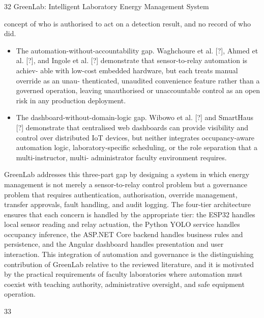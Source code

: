 32
GreenLab: Intelligent Laboratory Energy Management System


concept of who is authorised to act on a detection result, and no record of who did.

\begin{itemize}
  \item The automation-without-accountability gap. Waghchoure et al. [?], Ahmed et
al. [?], and Ingole et al. [?] demonstrate that sensor-to-relay automation is achiev-
able with low-cost embedded hardware, but each treats manual override as an unau-
thenticated, unaudited convenience feature rather than a governed operation, leaving
unauthorised or unaccountable control as an open risk in any production deployment.
\end{itemize}

\begin{itemize}
  \item The dashboard-without-domain-logic gap. Wibowo et al. [?] and SmartHaus [?]
demonstrate that centralised web dashboards can provide visibility and control over
distributed IoT devices, but neither integrates occupancy-aware automation logic,
laboratory-speciﬁc scheduling, or the role separation that a multi-instructor, multi-
administrator faculty environment requires.
\end{itemize}


GreenLab addresses this three-part gap by designing a system in which energy management is not merely a sensor-to-relay control problem but a governance problem that
requires authentication, authorisation, override management, transfer approvals, fault handling, and audit logging. The four-tier architecture ensures that each concern is handled by
the appropriate tier: the ESP32 handles local sensor reading and relay actuation, the Python
YOLO service handles occupancy inference, the ASP.NET Core backend handles business
rules and persistence, and the Angular dashboard handles presentation and user interaction.
This integration of automation and governance is the distinguishing contribution of GreenLab relative to the reviewed literature, and it is motivated by the practical requirements of
faculty laboratories where automation must coexist with teaching authority, administrative
oversight, and safe equipment operation.




33
